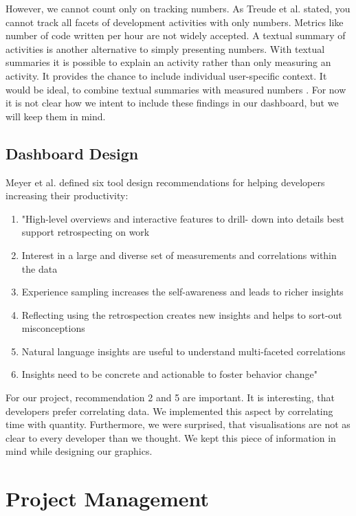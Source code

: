 \documentclass{seal_article}
\begin{document}
	However, we cannot count only on tracking numbers. As Treude et al. \cite{Treude:2015:SMD:2786805.2786827} stated, you cannot track all facets of development activities with only numbers. Metrics like number of code written per hour are not widely accepted. A textual summary of activities is another alternative to simply presenting numbers. With textual summaries it is possible to explain an activity rather than only measuring an activity. It provides the chance to include individual user-specific context. It would be ideal, to combine textual summaries with measured numbers \cite{Treude:2015:SMD:2786805.2786827}. For now it is not clear how we intent to include these findings in our dashboard, but we will keep them in mind. 
\subsection{Dashboard Design}

Meyer et al. \cite{Meyer:2017:DRS:3171581.3134714} defined six tool design recommendations for helping developers increasing their productivity:
\begin{enumerate}
	\item "High-level overviews and interactive features to drill- down into details best support retrospecting on work
	\item Interest in a large and diverse set of measurements and correlations within the data
	\item Experience sampling increases the self-awareness and leads to richer insights
	\item Reflecting using the retrospection creates new insights and helps to sort-out misconceptions
	\item Natural language insights are useful to understand multi-faceted correlations
	\item Insights need to be concrete and actionable to foster behavior change" \cite[p. 2]{Meyer:2017:DRS:3171581.3134714}
\end{enumerate}
For our project, recommendation 2 and 5 are important. It is interesting, that developers prefer correlating data. We implemented this aspect by correlating time with quantity. Furthermore, we were surprised, that visualisations are not as clear to every developer than we thought. We kept this piece of information in mind while designing our graphics. 

\section{Project Management}
\end{document}
